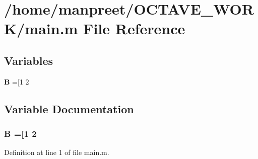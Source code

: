 \section{/home/manpreet/\-O\-C\-T\-A\-V\-E\-\_\-\-W\-O\-R\-K/main.m File Reference}
\label{main_8m}
\subsection*{Variables}
\begin{DoxyCompactItemize}
\item 
{\bf B} =[1 2
\end{DoxyCompactItemize}


\subsection{Variable Documentation}
\subsubsection[{B}]{\setlength{\rightskip}{0pt plus 5cm}B =[1 2}\label{main_8m_a9d3d9048db16a7eee539e93e3618cbe7}


Definition at line 1 of file main.\-m.

